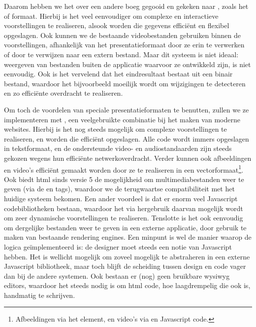 Daarom hebben we het over een andere boeg gegooid en gekeken naar , zoals het  of  formaat. Hierbij is het veel eenvoudiger om complexe en interactieve voorstellingen te realiseren, alsook worden die gegevens efficiënt en flexibel opgeslagen. Ook kunnen we de bestaande videobestanden gebruiken binnen de voorstellingen, afhankelijk van het presentatieformaat door ze erin te verwerken of door te verwijzen naar een extern bestand. Maar dit systeem is niet ideaal: weergeven van bestanden buiten de applicatie waarvoor ze ontwikkeld zijn, is niet eenvoudig. Ook is het vervelend dat het eindresultaat bestaat uit een binair bestand, waardoor het bijvoorbeeld moeilijk wordt om wijzigingen te detecteren en zo efficiënte overdracht te realiseren.

Om toch de voordelen van speciale presentatieformaten te benutten, zullen we ze implementeren met , een veelgebruikte combinatie bij het maken van moderne websites. Hierbij is het nog steeds mogelijk om complexe voorstellingen te realiseren, en worden die efficiënt opgeslagen. Alle code wordt immers opgeslagen in tekstformaat, en de ondersteunde video- en audiostandaarden zijn steeds gekozen wegens hun efficiënte netwerkoverdracht. Verder kunnen ook afbeeldingen en video's efficiënt gemaakt worden door ze te realiseren in een vectorformaat\footnote{Afbeeldingen via het  element, en video's via  en Javascript code.}. Ook biedt \ac{html} sinds versie 5 de mogelijkheid om multimediabestanden weer te geven (via de  en  tags), waardoor we de terugwaartse compatibiliteit met het huidige systeem bekomen. Een ander voordeel is dat er enorm veel Javascript codebibliotheken bestaan, waardoor het via hergebruik daarvan mogelijk wordt om zeer dynamische voorstellingen te realiseren. Tenslotte is het ook eenvoudig om dergelijke bestanden weer te geven in een externe applicatie, door gebruik te maken van bestaande rendering engines. Een minpunt is wel de manier waarop de logica geïmplementeerd is: de designer moet steeds een notie van Javascript hebben. Het is wellicht mogelijk om zoveel mogelijk te abstraheren in een externe Javascript bibliotheek, maar toch blijft de scheiding tussen design en code vager dan bij de andere systemen. Ook bestaan er (nog) geen bruikbare \ac{wysiwyg} editors, waardoor het steeds nodig is om \ac{html} code, hoe laagdrempelig die ook is, handmatig te schrijven.

